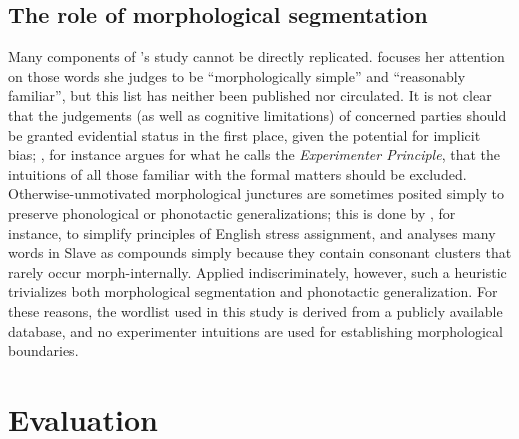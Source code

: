 \subsection{The role of morphological segmentation}

Many components of \citeauthor{Pierrehumbert1994}'s study cannot be directly replicated. \citeauthor{Pierrehumbert1994} focuses her attention on those words she judges to be ``morphologically simple'' and ``reasonably familiar'', but this list has neither been published nor circulated.
It is not clear that the judgements (as well as cognitive limitations) of concerned parties should be granted evidential status in the first place, given the potential for implicit bias; 
\citet{Labov1975}, for instance
argues for what he calls the \emph{Experimenter Principle}, 
that the intuitions of all those familiar with the formal matters should be excluded.
Otherwise-unmotivated morphological junctures are sometimes posited simply to preserve phonological or phonotactic generalizations; 
this is done by \citet{SPE}, for instance, to simplify principles of English stress assignment, and \citet[546]{Rice2009d} analyses many words in Slave as compounds simply because they contain consonant clusters that rarely occur morph-internally. 
Applied indiscriminately, however, such a heuristic trivializes both morphological segmentation and phonotactic generalization.
For these reasons, the wordlist used in this study is derived from a publicly available database, and no experimenter intuitions are used for establishing morphological boundaries.


\section{Evaluation}
\label{4evaluation}

